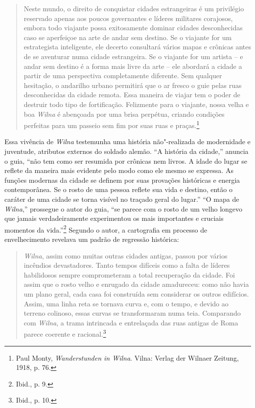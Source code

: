 \begin{quote}
Neste mundo, o direito de conquistar cidades estrangeiras é um
privilégio reservado apenas aos poucos governantes e líderes militares
corajosos, embora todo viajante possa exitosamente dominar cidades
desconhecidas caso se aperfeiçoe na arte de andar sem destino. Se o
viajante for um estrategista inteligente, ele decerto consultará vários
mapas e crônicas antes de se aventurar numa cidade estrangeira. Se o
viajante for um artista -- e andar sem destino é a forma mais livre da
arte -- ele abordará a cidade a partir de uma perspectiva completamente
diferente. Sem qualquer hesitação, o andarilho urbano permitirá que o ar
fresco o guie pelas ruas desconhecidas da cidade remota. Essa maneira de
viajar tem o poder de destruir todo tipo de fortificação. Felizmente
para o viajante, nossa velha e boa \textit{Wilna} é abençoada por uma brisa
perpétua, criando condições perfeitas para um passeio sem fim por suas
ruas e praças.\footnote{Paul Monty, \textit{Wanderstunden in Wilna}. Vilna: Verlag der Wilnaer Zeitung, 1918, p. 76.} 
\end{quote}

Essa vivência de \textit{Wilna} testemunha uma história não"-realizada de
modernidade e juventude, atributos externos do soldado alemão. ``A
história da cidade,'' anuncia o guia, ``não tem como ser resumida por
crônicas nem livros. A idade do lugar se reflete da maneira mais
evidente pelo modo como ele mesmo se expressa. As funções modernas da
cidade se definem por suas provações históricas e energia contemporânea.
Se o rosto de uma pessoa reflete sua vida e destino, então o caráter de
uma cidade se torna visível no traçado geral do lugar.'' ``O mapa de
\textit{Wilna},'' prossegue o autor do guia, ``se parece com o rosto de um velho
longevo que jamais verdadeiramente experimentou os mais importantes e
cruciais momentos da vida.''\footnote{Ibid., p. 9.} Segundo o autor, a
cartografia em processo de envelhecimento revelava um padrão de
regressão histórica:

\begin{quote}
\textit{Wilna}, assim como muitas outras cidades antigas, passou por vários
incêndios devastadores. Tanto tempos difíceis como a falta de líderes
habilidosos sempre comprometeram a total recuperação da cidade. Foi
assim que o rosto velho e enrugado da cidade amadureceu: como não havia
um plano geral, cada casa foi construída sem considerar os outros
edifícios. Assim, uma linha reta se tornava curva e, com o tempo, e
devido ao terreno colinoso, essas curvas se transformaram numa teia.
Comparando com \textit{Wilna}, a trama intrincada e entrelaçada das ruas antigas
de Roma parece coerente e racional.\footnote{Ibid., p. 10.}
\end{quote}

